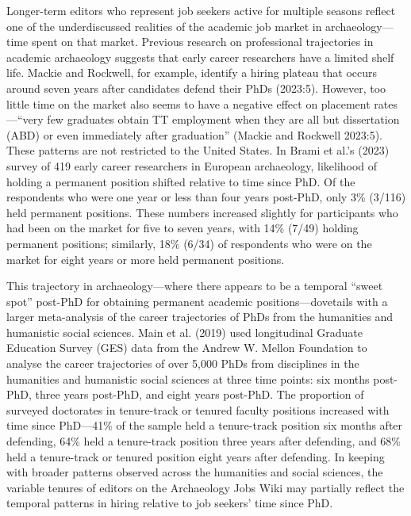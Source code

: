 \documentclass[
  12pt,
]{article}
\begin{document}
Longer-term editors who represent job seekers active for multiple
seasons reflect one of the underdiscussed realities of the academic job
market in archaeology---time spent on that market. Previous research on
professional trajectories in academic archaeology suggests that early
career researchers have a limited shelf life. Mackie and Rockwell, for
example, identify a hiring plateau that occurs around seven years after
candidates defend their PhDs (2023:5). However, too little time on the
market also seems to have a negative effect on placement rates---``very
few graduates obtain TT employment when they are all but dissertation
(ABD) or even immediately after graduation'' (Mackie and Rockwell
2023:5). These patterns are not restricted to the United States. In
Brami et al.'s (2023) survey of 419 early career researchers in European
archaeology, likelihood of holding a permanent position shifted relative
to time since PhD. Of the respondents who were one year or less than
four years post-PhD, only 3\% (3/116) held permanent positions. These
numbers increased slightly for participants who had been on the market
for five to seven years, with 14\% (7/49) holding permanent positions;
similarly, 18\% (6/34) of respondents who were on the market for eight
years or more held permanent positions.

This trajectory in archaeology---where there appears to be a temporal
``sweet spot'' post-PhD for obtaining permanent academic
positions---dovetails with a larger meta-analysis of the career
trajectories of PhDs from the humanities and humanistic social sciences.
Main et al. (2019) used longitudinal Graduate Education Survey (GES)
data from the Andrew W. Mellon Foundation to analyse the career
trajectories of over 5,000 PhDs from disciplines in the humanities and
humanistic social sciences at three time points: six months post-PhD,
three years post-PhD, and eight years post-PhD. The proportion of
surveyed doctorates in tenure-track or tenured faculty positions
increased with time since PhD---41\% of the sample held a tenure-track
position six months after defending, 64\% held a tenure-track position
three years after defending, and 68\% held a tenure-track or tenured
position eight years after defending. In keeping with broader patterns
observed across the humanities and social sciences, the variable tenures
of editors on the Archaeology Jobs Wiki may partially reflect the
temporal patterns in hiring relative to job seekers' time since PhD.
\end{document}

